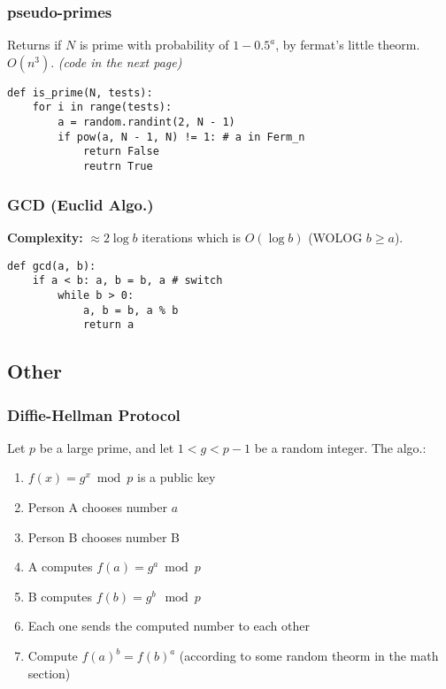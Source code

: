 \documentclass[]{article}
\begin{document}
\begin{multicols}{2}
		\subsubsection{pseudo-primes}
		Returns if $ N $ is prime with probability of $ 1 - 0.5^{a} $, by fermat's little theorm. $O(n^3)$. \textit{(code in the next page)}
		\pagebreak
		\begin{lstlisting}
def is_prime(N, tests): 
	for i in range(tests): 
		a = random.randint(2, N - 1)
		if pow(a, N - 1, N) != 1: # a in Ferm_n
			return False
			reutrn True\end{lstlisting}
		\subsubsection{GCD (Euclid Algo.)}
		\textbf{Complexity: }$ \approx 2 \log b $ iterations which is $ O(\log b) $ (WOLOG $ b \ge a $). 
		\begin{lstlisting}
def gcd(a, b): 
	if a < b: a, b = b, a # switch
		while b > 0: 
			a, b = b, a % b
			return a\end{lstlisting}
		
		\subsection{Other}
		\subsubsection{Diffie-Hellman Protocol}
		Let $ p $ be a large prime, and let $ 1 < g < p - 1 $ be a random integer. The algo.: 
		\begin{enumerate}
			\item $ f(x) = g^x \bmod p $ is a public key
			\item Person A chooses number $ a $
			\item Person B chooses number B
			\item A computes $ f(a) = g^a \bmod p $
			\item B computes $ f(b) = g^b \mod p $
			\item Each one sends the computed number to each other
			\item Compute $ f(a)^b = f(b)^a $ (according to some random theorm in the math section) 
		\end{enumerate}
	\end{multicols}
	
	
\end{document}
